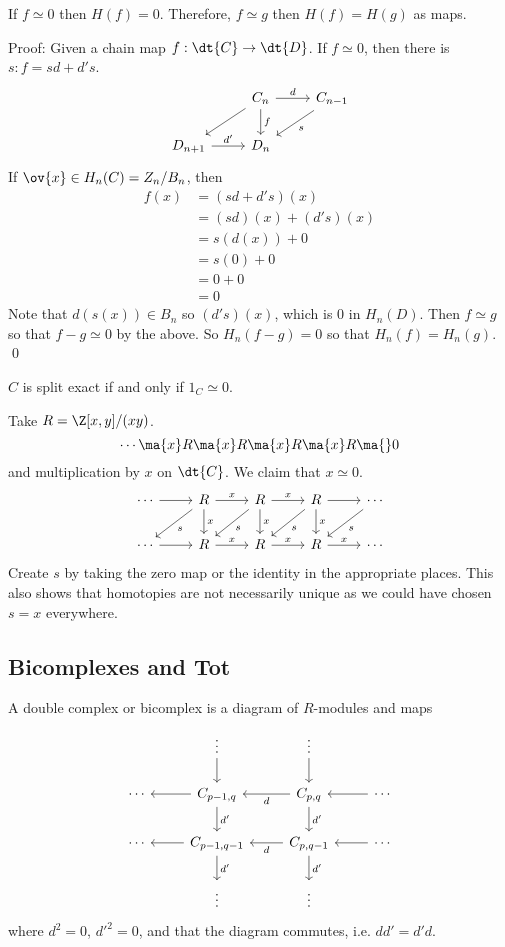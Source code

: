 \begin{prop}
If $f\simeq 0$ then $H(f)=0$. Therefore, $f \simeq g$ then $H(f)=H(g)$ as maps.
\end{prop}

Proof: Given a chain map $f: \dt{C} \to \dt{D}$. If $f \simeq 0$, then there is $s: f=sd+d's$.
\[
\begin{tikzcd}
\phantom{x} & C_n \arrow{r}{d} \arrow{dl} \arrow{d}{f} & C_{n-1} \arrow{dl}{s} \\
D_{n+1} \arrow{r}{d'} & D_n & 
\end{tikzcd}
\]
If $\ov{x} \in H_n(C)= Z_n/B_n$, then 
\[
\begin{split}
f(x)&=(sd+d's)(x) \\
&=(sd)(x)+(d's)(x) \\
&=s(d(x))+0 \\
&=s(0) + 0 \\
&= 0 + 0 \\
&= 0 
\end{split}
\]
Note that $d(s(x)) \in B_n$ so $(d's)(x)$, which is 0 in $H_n(D)$. Then $f \simeq g$ so that $f-g \simeq 0$ by the above. So $H_n(f-g)=0$ so that $H_n(f)=H_n(g)$. \qed \\

\begin{prop}
$C$ is split exact if and only if $1_C \simeq 0$. 
\end{prop}

\begin{ex}
Take $R=\Z[x,y]/(xy)$. 
\[
\cdots \ma{x} R \ma{x} R \ma{x} R \ma{x} R \ma{} 0 
\] 
and multiplication by $x$ on $\dt{C}$. We claim that $x \simeq 0$. 
\[
\begin{tikzcd}
\cdots \arrow{r} & R \arrow{r}{x} \arrow{d}{x} \arrow{dl}{s} & R \arrow{r}{x} \arrow{d}{x} \arrow{dl}{s} & R \arrow{r} \arrow{d}{x} \arrow{dl}{s} & \cdots \arrow{dl}{s} \\
\cdots \arrow{r} & R \arrow{r}{x} & R \arrow{r}{x} & R \arrow{r}{x} & \cdots 
\end{tikzcd}
\]
Create $s$ by taking the zero map or the identity in the appropriate places. This also shows that homotopies are not necessarily unique as we could have chosen $s=x$ everywhere. 
\end{ex}

\subsection{Bicomplexes and Tot}

\begin{dfn}[Bicomplex]
A double complex or bicomplex is a diagram of $R$-modules and maps
\[
\begin{tikzcd}
\phantom{x} & \vdots \arrow{d} & \vdots \arrow{d} & \\
\cdots & C_{p-1,q} \arrow{l} \arrow{d}{d'} & C_{p,q} \arrow{l}{d} \arrow{d}{d'} & \cdots \arrow{l} \\
\cdots & C_{p-1,q-1} \arrow{l} \arrow{d}{d'} & C_{p,q-1} \arrow{l}{d} \arrow{d}{d'} & \cdots \arrow{l} \\
& \vdots & \vdots & 
\end{tikzcd}
\]
where $d^2=0$, $d'^2=0$, and that the diagram commutes, i.e. $dd'=d'd$. 
\end{dfn}

